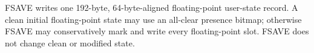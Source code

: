 FSAVE writes one 192-byte, 64-byte-aligned floating-point user-state record. A clean initial floating-point state may use an all-clear presence bitmap; otherwise FSAVE may conservatively mark and write every floating-point slot. FSAVE does not change clean or modified state.
